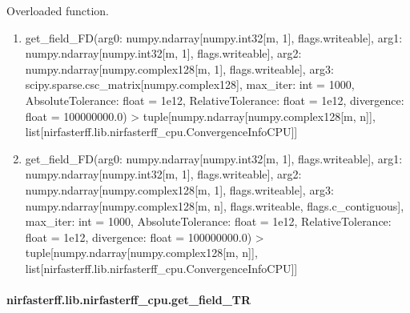 \documentclass[letterpaper,10pt,english]{sphinxmanual}
\begin{document}
\begin{fulllineitems}
\label{\detokenize{_autosummary/nirfasterff.lib.nirfasterff_cpu.get_field_FD:nirfasterff.lib.nirfasterff_cpu.get_field_FD}}
\pysigstartsignatures
{}
\pysigstopsignatures
\sphinxAtStartPar
Overloaded function.
\begin{enumerate}
%
\item {} 
\sphinxAtStartPar
get\_field\_FD(arg0: numpy.ndarray{[}numpy.int32{[}m, 1{]}, flags.writeable{]}, arg1: numpy.ndarray{[}numpy.int32{[}m, 1{]}, flags.writeable{]}, arg2: numpy.ndarray{[}numpy.complex128{[}m, 1{]}, flags.writeable{]}, arg3: scipy.sparse.csc\_matrix{[}numpy.complex128{]}, max\_iter: int = 1000, AbsoluteTolerance: float = 1e\sphinxhyphen{}12, RelativeTolerance: float = 1e\sphinxhyphen{}12, divergence: float = 100000000.0) \sphinxhyphen{}\textgreater{} tuple{[}numpy.ndarray{[}numpy.complex128{[}m, n{]}{]}, list{[}nirfasterff.lib.nirfasterff\_cpu.ConvergenceInfoCPU{]}{]}

\item {} 
\sphinxAtStartPar
get\_field\_FD(arg0: numpy.ndarray{[}numpy.int32{[}m, 1{]}, flags.writeable{]}, arg1: numpy.ndarray{[}numpy.int32{[}m, 1{]}, flags.writeable{]}, arg2: numpy.ndarray{[}numpy.complex128{[}m, 1{]}, flags.writeable{]}, arg3: numpy.ndarray{[}numpy.complex128{[}m, n{]}, flags.writeable, flags.c\_contiguous{]}, max\_iter: int = 1000, AbsoluteTolerance: float = 1e\sphinxhyphen{}12, RelativeTolerance: float = 1e\sphinxhyphen{}12, divergence: float = 100000000.0) \sphinxhyphen{}\textgreater{} tuple{[}numpy.ndarray{[}numpy.complex128{[}m, n{]}{]}, list{[}nirfasterff.lib.nirfasterff\_cpu.ConvergenceInfoCPU{]}{]}

\end{enumerate}

\end{fulllineitems}


\sphinxstepscope


\paragraph{nirfasterff.lib.nirfasterff\_cpu.get\_field\_TR}
\label{\detokenize{_autosummary/nirfasterff.lib.nirfasterff_cpu.get_field_TR:nirfasterff-lib-nirfasterff-cpu-get-field-tr}}\label{\detokenize{_autosummary/nirfasterff.lib.nirfasterff_cpu.get_field_TR::doc}}
\end{document}
